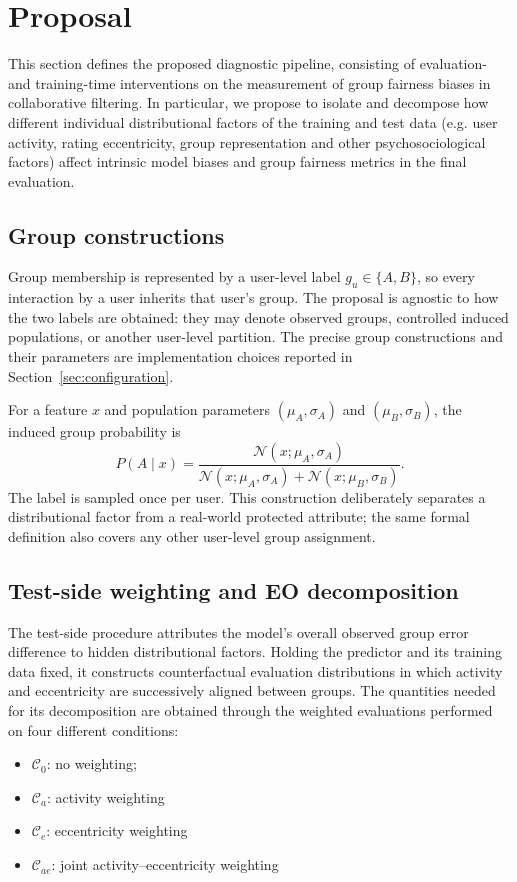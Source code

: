 \documentclass[11pt]{article}
\begin{document}
\section{Proposal}
\label{sec:method}

This section defines the proposed diagnostic pipeline, consisting of evaluation- and training-time interventions on the measurement of group fairness biases in collaborative filtering. In particular, we propose to isolate and decompose how different individual distributional factors of the training and test data (e.g. user activity, rating eccentricity, group representation and other psychosociological factors) affect intrinsic model biases and group fairness metrics in the final evaluation. 


\subsection{Group constructions}
\label{sec:group-constructions}

Group membership is represented by a user-level label $g_u\in\{A,B\}$, so
every interaction by a user inherits that user's group. The proposal is
agnostic to how the two labels are obtained: they may denote observed groups,
controlled induced populations, or another user-level partition. The
precise group constructions and their parameters are implementation choices
reported in Section~\ref{sec:configuration}.

For a feature $x$ and population parameters $(\mu_A,\sigma_A)$ and
$(\mu_B,\sigma_B)$, the induced group probability is
\begin{equation}
 P(A\mid x)=\frac{\mathcal{N}(x;\mu_A,\sigma_A)}
 {\mathcal{N}(x;\mu_A,\sigma_A)+\mathcal{N}(x;\mu_B,\sigma_B)}.
\end{equation}
The label is sampled once per user. This construction deliberately separates a
distributional factor from a real-world protected attribute; the same formal
definition also covers any other user-level group assignment.

\subsection{Test-side weighting and EO decomposition}
\label{sec:test-intervention}

The test-side procedure attributes the model's overall observed group error
difference to hidden distributional factors. Holding the predictor and its
training data fixed, it constructs counterfactual evaluation distributions in
which activity and eccentricity are successively aligned between groups. The quantities needed for its decomposition are obtained through the weighted evaluations performed on four different conditions:
\begin{itemize}
    \item $\mathcal C_0$: no weighting;
    \item $\mathcal C_a$: activity weighting
    \item $\mathcal C_e$: eccentricity weighting
    \item $\mathcal C_{ae}$: joint activity--eccentricity weighting
\end{itemize}
\end{document}
